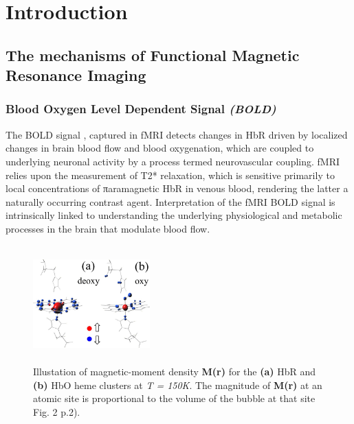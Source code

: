 \pagebreak
{}
\chapter{Introduction}


\section{The mechanisms of Functional Magnetic Resonance Imaging}

\subsection{Blood Oxygen Level Dependent Signal \textit{(BOLD)}}

The \gls{BOLD} signal , captured in \gls{fMRI} detects changes in \gls{HbR} driven by localized changes in brain blood flow and blood oxygenation, which are coupled to underlying neuronal activity by a process termed neurovascular coupling. \gls{fMRI} relies upon the measurement of T2* relaxation, which is sensitive primarily to local concentrations of πaramagnetic \gls{HbR} in venous blood, rendering the latter a naturally occurring contrast agent. Interpretation of the \gls{fMRI} \gls{BOLD} signal is intrinsically linked to understanding the underlying physiological and metabolic processes in the brain that modulate blood flow.

\begin{figure}
   \centering
   \includegraphics[width = 0.4\textwidth, height = 4.5cm]{assets/images/DeoxyHb_magnetic.jpg}
   \caption{Illustation of magnetic-moment density \textbf{M(r)} for the \textbf{(a)} \gls{HbR} and \textbf{(b)} \gls{HbO} heme clusters at \textit{T = 150K}. The magnitude of \textbf{M(r)} at an atomic site is proportional to the volume of the bubble at that site \cite{Mayda2020} Fig. 2 p.2).}
   \label{fig:HbMagnetic}
\end{figure}

